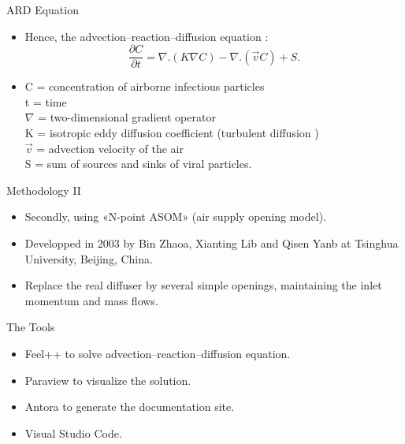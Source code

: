 \documentclass[10pt]{beamer}
\begin{document}
\begin{frame}{ARD Equation}
    \begin{itemize}
        \item Hence, the advection–reaction–diffusion equation :
        \\ $$ \frac{\partial C}{\partial t} = \nabla . (K  \nabla  C) - \nabla . (\overrightarrow{v}  C) + S.$$
        \item C = concentration of airborne infectious particles \\
        t = time \\
        $\nabla$ = two-dimensional gradient operator \\
        K = isotropic eddy diffusion coefficient (turbulent diffusion ) \\
        $\overrightarrow{v}$ = advection velocity of the air \\
        S = sum of sources and sinks of viral particles.
    \end{itemize}  

\end{frame}

\begin{frame}{Methodology II}
    \begin{itemize}
        \item Secondly, using «N-point ASOM» (air supply opening model).
        \item Developped in 2003 by Bin Zhaoa, Xianting Lib and Qisen Yanb at Tsinghua University, Beijing, China. 
        \item Replace the real diffuser by several simple openings, maintaining the inlet momentum and mass flows.
    \end{itemize}
\end{frame}
 
\begin{frame}{The Tools}
    \begin{itemize}
        \item Feel++ to solve advection–reaction–diffusion equation.
        \item Paraview to visualize the solution.
        \item Antora to generate the documentation site.
        \item Visual Studio Code.
    \end{itemize}
\end{frame}
\end{document}
